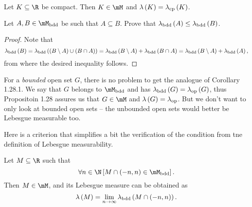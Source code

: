 \documentclass[pmath450]{subfiles}
\begin{document}
    \begin{cor}{}
        Let $K\subseteq\R$ be compact. Then $K\in\mM$ and $\lambda\left( K \right)=\lambda_{\operatorname{cp}}\left( K \right)$.
    \end{cor}	


    \begin{exercise}{}
        Let $A,B\in\mM_{\bdd}$ be such that $A\subseteq B$. Prove that $\lambda_{\operatorname{bdd}}\left( A \right)\leq\lambda_{\operatorname{bdd}}\left( B \right)$.
    \end{exercise}

    \begin{proof}
        Note that
        \begin{equation*}
            \lambda_{\operatorname{bdd}}\left( B \right) = \lambda_{\operatorname{bdd}}\left( \left( B\setminus A \right)\cup \left( B\cap A \right) \right) = \lambda_{\operatorname{bdd}}\left( B\setminus A \right) + \lambda_{\operatorname{bdd}}\left( B\cap A \right) = \lambda_{\operatorname{bdd}}\left( B\setminus A \right)+\lambda_{\operatorname{bdd}}\left( A \right),
        \end{equation*}
        from where the desired inequality follows.
    \end{proof}

    \np For a \textit{bounded} open set $G$, there is no problem to get the analogue of Corollary 1.28.1. We say that $G$ belongs to $\mM_{\bdd}$ and has $\lambda_{\operatorname{bdd}}\left( G \right)=\lambda_{\operatorname{op}}\left( G \right)$, thus Propositoin 1.28 assures us that $G\in\mM$ and $\lambda\left( G \right)=\lambda_{\operatorname{op}}$. But we don't want to only look at bounded open sets -- the unbounded open sets would better be Lebesgue measurable too. 

    Here is a criterion that simplifies a bit the verification of the condition from tne definition of Lebesgue measurability.

    \begin{prop}{}
        Let $M\subseteq\R$ such that
        \begin{equation}
            \forall n\in\N \left[ M\cap\left( -n,n \right)\in\mM_{\bdd}\right].
        \end{equation}
        Then $M\in\mM$, and its Lebesgue measure can be obtained as
        \begin{equation}
            \lambda\left( M \right) = \lim_{n\to\infty}\lambda_{\operatorname{bdd}}\left( M\cap\left( -n,n \right) \right).
        \end{equation}
    \end{prop}
\end{document}
